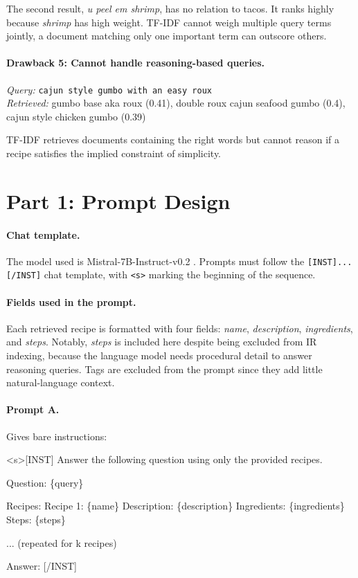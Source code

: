 \documentclass[a4paper,11pt]{article}
\begin{document}
The second result, \textit{u peel em shrimp}, has no relation to tacos. It ranks highly because \textit{shrimp} has high weight. TF-IDF cannot weigh multiple query terms jointly, a document matching only one important term can outscore others.

\paragraph{Drawback 5: Cannot handle reasoning-based queries.}
\textit{Query:} \texttt{cajun style gumbo with an easy roux} \\
\textit{Retrieved:} gumbo base aka roux (0.41), double roux cajun seafood gumbo (0.4), cajun style chicken gumbo (0.39)

TF-IDF retrieves documents containing the right words but cannot reason if a recipe satisfies the implied constraint of simplicity.
\clearpage
\section*{Part 1: Prompt Design}
\label{sec:prompt}

\paragraph{Chat template.}
The model used is Mistral-7B-Instruct-v0.2 \parencite{jiang_mistral_2023}. Prompts must follow the \texttt{[INST]...[/INST]} chat template, with \texttt{<s>} marking the beginning of the sequence.

\paragraph{Fields used in the prompt.}
Each retrieved recipe is formatted with four fields: \textit{name}, \textit{description}, \textit{ingredients}, and \textit{steps}. Notably, \textit{steps} is included here despite being excluded from IR indexing, because the language model needs procedural detail to answer reasoning queries. Tags are excluded from the prompt since they add little natural-language context.

\paragraph{Prompt A.}
Gives bare instructions:

\begin{tcolorbox}[title=Prompt A, fontupper=\small\ttfamily\raggedright, breakable]
<s>[INST] Answer the following question using only the provided recipes.

Question: \{query\}

Recipes:
Recipe 1: \{name\}
Description: \{description\}
Ingredients: \{ingredients\}
Steps: \{steps\}

... (repeated for k recipes)

Answer: [/INST]
\end{tcolorbox}
\end{document}
